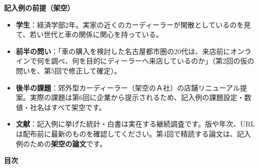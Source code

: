 \vspace{4mm}
\begin{tcolorbox}[enhanced,colback=white,colframe=rulegray,boxrule=0.5pt,arc=1.5mm,
    left=4mm,right=4mm,top=3mm,bottom=3mm,fontupper=\small]
{\sffamily\bfseries 記入例の前提（架空）}\par\vspace{1mm}
\begin{itemize}[label=・]
  \item \textbf{学生}：経済学部2年。実家の近くのカーディーラーが閑散としているのを見て、若い世代と車の関係に関心を持っている。
  \item \textbf{前半の問い}：「車の購入を検討した名古屋都市圏の20代は、来店前にオンラインで何を調べ、何を目的にディーラーへ来店しているのか」（第2回の仮の問いを、第5回で修正して確定）。
  \item \textbf{後半の課題}：郊外型カーディーラー（架空のＡ社）の店舗リニューアル提案。実際の課題は第6回に企業から提示されるため、記入例の課題設定・数値・社名はすべて架空です。
  \item \textbf{文献}：記入例に挙げた統計・白書は実在する継続調査です。版や年次、URLは配布前に最新のものを確認してください。第4回で精読する論文は、記入例のための\textbf{架空の論文}です。
\end{itemize}
\end{tcolorbox}

\vspace{6mm}
{\sffamily\bfseries 目次}\par\vspace{1mm}
{\small\makeatletter{}\makeatother}
